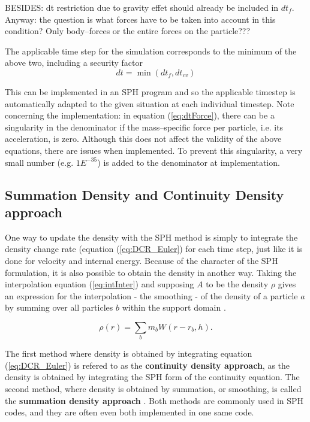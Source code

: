 \documentclass{report}
\begin{document}
BESIDES: dt restriction due to gravity effet should already be included in $dt_f$. Anyway: the question is what forces have to be taken into account in this condition? Only body--forces or the entire forces on the particle???

The applicable time step for the simulation corresponds to the minimum of the above two, including a security factor 
\begin{equation}
\label{eq:dt}
dt=\min(dt_f,dt_{cv})
\end{equation}

This can be implemented in an SPH program and so the applicable timestep is automatically adapted to the given situation at each individual timestep. 
Note concerning the implementation: in equation (\ref{eq:dtForce}), there can be a singularity in the denominator if the mass--specific force per particle, i.e. its acceleration, is zero. Although this does not affect the validity of the above equations, there are issues when implemented. To prevent this singularity, a very small number (e.g. $1E^{-35}$) is added to the denominator at implementation.




\subsection{Summation Density and Continuity Density approach}
\label{sec:DensCalcMode}
One way to update the density with the SPH method is simply to integrate the density 
change rate (equation (\ref{eq:DCR_Euler}) for each time step, just like it is done for velocity 
and internal energy. Because of the character of the SPH formulation, it is also  
possible to obtain the density in another way. Taking the interpolation equation 
(\ref{eq:intInter}) and supposing $A$ to be the density $\rho$ gives an expression for 
the interpolation - the smoothing - of the density of a particle $a$ by summing over 
all particles $b$ within the support domain \cite{Monaghan2005}.

\begin{equation}
\label{eq:SumDensity}
\rho(r)=\sum_b m_b W(r-r_b,h).
\end{equation}

The first method where density is obtained by integrating equation (\ref{eq:DCR_Euler}) is refered 
to as the {\bf continuity density approach}, as the density is obtained by integrating the SPH form of the continuity equation. The second method, where density is obtained by 
summation, or smoothing, is called the {\bf summation density approach} \cite{Liu2003}. 
Both methods are commonly used in SPH codes, and they are often even both implemented 
in one same code. 
\end{document}
